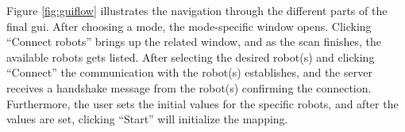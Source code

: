 Figure \ref{fig:guiflow} illustrates the navigation through the different parts of the final \acrshort{gui}. After choosing a mode, the mode-specific window opens. Clicking ``Connect robots'' brings up the related window, and as the scan finishes, the available robots gets listed. After selecting the desired robot(s) and clicking ``Connect'' the communication with the robot(s) establishes, and the server receives a handshake message from the robot(s) confirming the connection. Furthermore, the user sets the initial values for the specific robots, and after the values are set, clicking ``Start'' will initialize the mapping.

